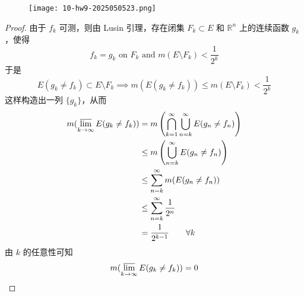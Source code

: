\begin{exercise}
\begin{figure}[H]
\centering
\texttt{[image: 10-hw9-2025050523.png]}
\label{}
\end{figure}
\end{exercise}
\begin{proof}
由于 $f_k$ 可测，则由 Lusin 引理，存在闭集 $F_k\subset E$ 和 $\mathbb{R}^{n}$ 上的连续函数 $g_k$，使得
\[
f_k=g_k\text{ on }F_k\text{ and }m(E\setminus F_k)<\frac{1}{2^{k}}
\]
于是
\[
E(g_k\neq f_k)\subset E\setminus F_k\implies m(E(g_k\neq f_k))\leq m(E\setminus F_k)<\frac{1}{2^{k}}
\]
这样构造出一列 $\{ g_k \}$，从而
\[
\begin{aligned}
m(\varlimsup_{ k \to \infty } E(g_k\neq f_k)) & =m\left( \bigcap_{k=1}^{\infty} \bigcup_{n=k}^{\infty} E(g_n\neq f_n) \right) \\
 & \leq m\left( \bigcup_{n=k}^{\infty} E(g_n\neq f_n) \right) \\
 & \leq \sum_{n=k}^{\infty} m(E(g_n\neq f_n)) \\
 & \leq \sum_{n=k}^{\infty} \frac{1}{2^{n}} \\
 & =\frac{1}{2^{k-1}}\qquad \forall k
\end{aligned}
\]
由 $k$ 的任意性可知
\[
m(\varlimsup_{ k \to \infty } E(g_k\neq f_k))=0
\]
\end{proof}
